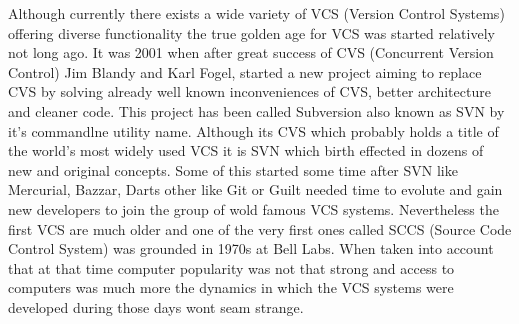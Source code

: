 Although currently there exists a wide variety of VCS (Version Control Systems) offering diverse functionality the true golden age for VCS was started relatively not long ago. It was 2001 when after great success of CVS (Concurrent Version Control) Jim Blandy and Karl Fogel, started a new project aiming to replace CVS by solving already well known inconveniences of CVS, better architecture and cleaner code\cite{hg_book}. This project has been called Subversion also known as SVN by it's commandlne utility name. Although its CVS which probably holds a title of the world's most widely used VCS it is SVN which birth effected in dozens of new and original concepts. Some of this started some time after SVN like Mercurial, Bazzar, Darts other like Git or Guilt needed time to evolute and gain new developers to join the group of wold famous VCS systems. Nevertheless the first VCS are much older and one of the very first ones called SCCS (Source Code Control System) was grounded in 1970s at Bell Labs. When taken into account that at that time computer popularity was not that strong and access to computers was much more the dynamics in which the VCS systems were developed during those days wont seam strange. 
